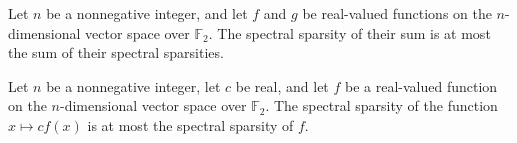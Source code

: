 \begin{theorem}
\label{FABL.spectralSparsity_add_le}
\leanok
{}
Let $n$ be a nonnegative integer, and let $f$ and $g$ be real-valued functions on the
$n$-dimensional vector space over $\mathbb F_2$. The spectral sparsity of their sum is
at most the sum of their spectral sparsities.
\end{theorem}

\begin{theorem}
\label{FABL.spectralSparsity_const_mul_le}
\leanok
{}
Let $n$ be a nonnegative integer, let $c$ be real, and let $f$ be a real-valued function
on the $n$-dimensional vector space over $\mathbb F_2$. The spectral sparsity of the
function $x\mapsto c f(x)$ is at most the spectral sparsity of $f$.
\end{theorem}

